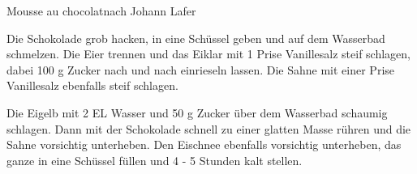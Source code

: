 \begin{recipe}{Mousse au chocolat}{nach Johann Lafer}
  \inglist

  \steps
  Die Schokolade grob hacken, in eine Schüssel geben und auf dem Wasserbad schmelzen. Die
  Eier trennen und das Eiklar mit 1 Prise Vanillesalz steif schlagen, dabei 100 g Zucker
  nach und nach einrieseln lassen. Die Sahne mit einer Prise Vanillesalz ebenfalls steif
  schlagen.

  Die Eigelb mit 2 EL Wasser und 50 g Zucker über dem Wasserbad schaumig schlagen. Dann
  mit der Schokolade schnell zu einer glatten Masse rühren und die Sahne vorsichtig
  unterheben. Den Eischnee ebenfalls vorsichtig unterheben, das ganze in eine Schüssel
  füllen und 4 - 5 Stunden kalt stellen.
\end{recipe}
